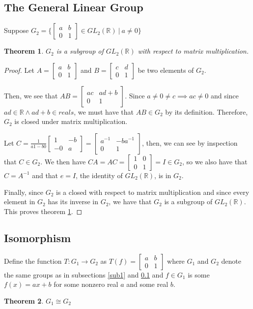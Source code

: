 \documentclass[12pt]{article}
\newcommand{\reals}{\mathbb{R}}
\newcommand{\gltwo}{GL_2(\reals)}
\newcommand{\glmatrix}[4]{\ensuremath{\begin{bmatrix} #1 & #2 \\ #3 & #4 \end{bmatrix}}}
\newcommand{\glinverse}[4]{\ensuremath{\frac{1}{#1 #4 - #2 #3}\glmatrix{#4}{-#2}{-#3}{#1}}}
\newtheorem{thm}{Theorem}
\begin{document}
\subsection{The General Linear Group} \label{sub2}

Suppose $G_2 = \Big\{\glmatrix{a}{b}{0}{1} \in \gltwo \ |\ a \neq 0 \Big\}$

\begin{thm} \label{thm6}
	$G_2$ is a subgroup of $\gltwo$ with respect to matrix multiplication.
\end{thm}

\begin{proof}
	Let $A = \glmatrix{a}{b}{0}{1}$ and $B = \glmatrix{c}{d}{0}{1}$
	be two elements of $G_2$.

	Then, we see that $AB = \glmatrix{ac}{ad + b}{0}{1}$.
	Since $a \neq 0 \neq c \implies ac \neq 0$ and
	since $ad \in \reals \land ad + b \in reals$,
	we must have that $AB \in G_2$ by its definition.
	Therefore, $G_2$ is closed under matrix multiplication.

	Let $C = \glinverse{a}{b}{0}{1} = \glmatrix{a^{-1}}{-ba^{-1}}{0}{1}$,
	then, we can see by inspection that $C \in G_2$.
	We then have $CA = AC = \glmatrix{1}{0}{0}{1} = I \in G_2$,
	so we also have that $C = A^{-1}$
	and that $e = I$, the identity of $\gltwo$, is in $G_2$.

	Finally, since $G_2$ is a closed with respect to
	matrix multiplication and
	since every element in $G_2$ has its inverse in $G_2$,
	we have that $G_2$ is a subgroup of $\gltwo$.
	This proves theorem \ref{thm6}.
	
\end{proof}

\subsection{Isomorphism}

Define the function $T: G_1 \to G_2$ as $T(f) = \glmatrix{a}{b}{0}{1}$
where $G_1$ and $G_2$ denote the same groups as in subsections \ref{sub1} and \ref{sub2}
and $f \in G_1$ is some $f(x) = ax + b$ for some nonzero real $a$ and some real $b$.

\begin{thm} \label{thm7}
	$G_1 \cong G_2$
\end{thm}
\end{document}
